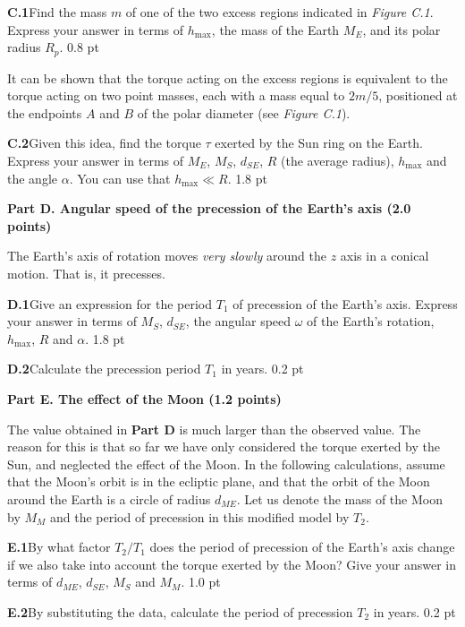 \textbf{C.1}\quad Find the mass $m$ of one of the two excess regions indicated
in \textit{Figure C.1}. Express your answer in terms of $h_{\mathrm{max}}$, the
mass of the Earth $M_E$, and its polar radius $R_p$. \hfill 0.8 pt

It can be shown that the torque acting on the excess regions is equivalent to
the torque acting on two point masses, each with a mass equal to $2m/5$,
positioned at the endpoints $A$ and $B$ of the polar diameter (see
\textit{Figure C.1}).

\textbf{C.2}\quad Given this idea, find the torque $\tau$ exerted by the Sun
ring on the Earth. Express your answer in terms of $M_E$, $M_S$, $d_{SE}$, $R$
(the average radius), $h_{\mathrm{max}}$ and the angle $\alpha$. You can use
that $h_{\mathrm{max}} \ll R$. \hfill 1.8 pt

\textbf{Part D. Angular speed of the precession of the Earth's axis (2.0 points)}

The Earth's axis of rotation moves \textit{very slowly} around the $z$ axis in
a conical motion. That is, it precesses.

\textbf{D.1}\quad Give an expression for the period $T_1$ of precession of the
Earth's axis. Express your answer in terms of $M_S$, $d_{SE}$, the angular
speed $\omega$ of the Earth's rotation, $h_{\mathrm{max}}$, $R$ and $\alpha$.
\hfill 1.8 pt

\textbf{D.2}\quad Calculate the precession period $T_1$ in years. \hfill 0.2 pt

\textbf{Part E. The effect of the Moon (1.2 points)}

The value obtained in \textbf{Part D} is much larger than the observed value.
The reason for this is that so far we have only considered the torque exerted
by the Sun, and neglected the effect of the Moon. In the following
calculations, assume that the Moon's orbit is in the ecliptic plane, and that
the orbit of the Moon around the Earth is a circle of radius $d_{ME}$. Let us
denote the mass of the Moon by $M_M$ and the period of precession in this
modified model by $T_2$.

\textbf{E.1}\quad By what factor $T_2/T_1$ does the period of precession of the
Earth's axis change if we also take into account the torque exerted by the
Moon? Give your answer in terms of $d_{ME}$, $d_{SE}$, $M_S$ and $M_M$.
\hfill 1.0 pt

\textbf{E.2}\quad By substituting the data, calculate the period of precession
$T_2$ in years. \hfill 0.2 pt
